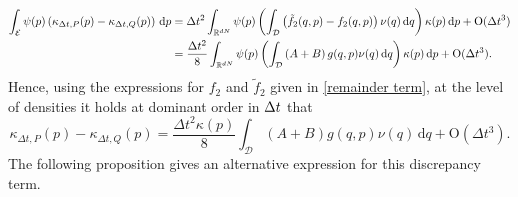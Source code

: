 \begin{align*}
  \int_{\mathcal E}\psi(p)\left(\kappa_{\Delta t,P}(p)-\kappa_{\Delta t,Q}(p)\right)\,\mathrm{d}p&=\Delta t^2\int_{\mathbb{R}^{dN}}\psi(p)\left(\int_{\mathcal D}\left(\tilde f_2(q,p)-f_2(q,p)\right)\nu(q)\,\mathrm{d}q\right)\kappa(p)\,\mathrm{d}p +\mathrm{O}(\Delta t^3)\\
  &=\frac{\Delta t^2}8\int_{\mathbb{R}^{dN}}\psi(p)\left(\int_{\mathcal D}\left(A+B\right)g(q,p)\nu(q)\,\mathrm{d}q\right)\kappa(p)\,\mathrm{d}p +\mathrm{O}(\Delta t^3).
\end{align*}
Hence, using the expressions for $f_2$ and $\tilde f_2$ given in \eqref{remainder term}, at the level of densities it holds at dominant order in ${\Delta t}$ that
$$ \kappa_{\Delta t,P}(p)- \kappa_{\Delta t,Q}(p)=\frac{\Delta t^2\kappa(p)}8\int_{\mathcal D}\left(A+B\right)g(q,p)\nu(q)\,\mathrm{d}q + \mathrm{O}(\Delta t^3).$$
The following proposition gives an alternative expression for this discrepancy term.


